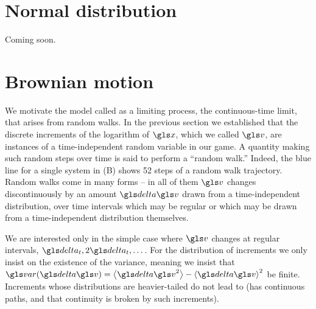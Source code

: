 %

\section{Normal distribution}
Coming soon.

\section{Brownian motion}
We motivate the model called \BM as a limiting process, the continuous-time limit, that arises from random walks.
In the previous section we established that the discrete increments of the logarithm of 
$\x$, which we called $\gv$, are instances of a time-independent random variable in our game. A quantity 
making such random steps over time is said to perform a ``random walk.'' 
Indeed, the blue line for a single system in  (B) shows 52 steps of a random walk trajectory.
Random walks come in many forms -- in all of them $\gv$ changes discontinuously by an amount 
$\d \gv$ drawn from a time-independent distribution, over time intervals which may be regular or which may be drawn from a time-independent distribution themselves.

We are interested only in the simple case where $\gv$ changes at regular intervals, $\dt, 2\dt, \dots$. For 
the distribution of increments we only insist on the existence of the variance, meaning we insist that 
$\var(\d \gv)=\ave{\d \gv^2}-\ave{\d \gv}^2$ be finite. Increments whose distributions are heavier-tailed do 
not lead to \BM (\BM has continuous paths, and that continuity 
is broken by such increments).

